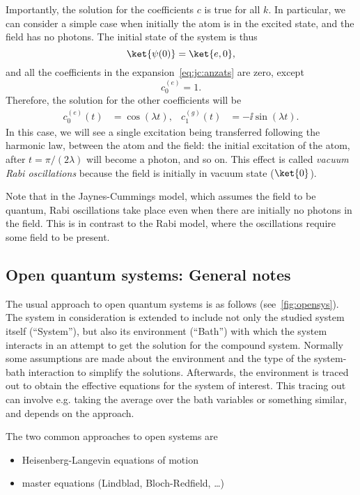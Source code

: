 \documentclass[fontsize=9pt,bookmarkpackage=false]{scrartcl}
\begin{document}
Importantly, the solution for the coefficients $c$ is true for all $k$.
In particular, we can consider a simple case when initially the atom is in the excited state, and the field has no photons.
The initial state of the system is thus
\begin{equation}
  \ket{ \psi (0) } = \ket{ e, 0 },
\end{equation}
and all the coefficients in the expansion~\eqref{eq:jc:anzats} are zero, except
\begin{equation}
  c_0^{(e)} = 1.
\end{equation}
Therefore, the solution for the other coefficients will be
\begin{align}
  c_0^{(e)} (t) & = \cos(  \lambda t ),
  &
  c_1^{(g)} (t) & = - \ii \sin ( \lambda t ).
\end{align}
In this case, we will see a single excitation being transferred following the harmonic law, between the atom and the field: the initial excitation of the atom, after $t = \pi / ( 2 \lambda)$ will become a photon, and so on.
This effect is called \emph{vacuum Rabi oscillations} because the field is initially in vacuum state ($\ket{ 0}$).

Note that in the Jaynes-Cummings model, which assumes the field to be quantum, Rabi oscillations take place even when there are initially no photons in the field.
This is in contrast to the Rabi model, where the oscillations require some field to be present.


\subsection{Open quantum systems: General notes} %
\label{sec:open_quantum_systems}

The usual approach to open quantum systems is as follows (see~\cref{fig:opensys}).
The system in consideration is extended to include not only the studied system itself (``System''), but also its environment (``Bath'') with which the system interacts in an attempt to get the solution for the compound system.
Normally some assumptions are made about the environment and the type of the system-bath interaction to simplify the solutions.
Afterwards, the environment is traced out to obtain the effective equations for the system of interest.
This tracing out can involve e.g. taking the average over the bath variables or something similar, and depends on the approach.

The two common approaches to open systems are
\begin{itemize}
  \tightlist
  \item Heisenberg-Langevin equations of motion
  \item master equations (Lindblad, Bloch-Redfield, \dots)
\end{itemize}
\end{document}
